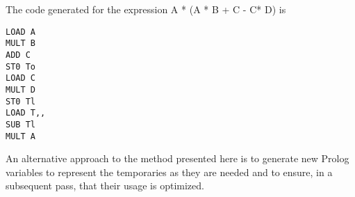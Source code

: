 The code generated for the expression A * (A * B + C - C* D) is
\begin{verbatim}
LOAD A
MULT B
ADD C
ST0 To
LOAD C
MULT D
ST0 Tl
LOAD T,,
SUB Tl
MULT A 
\end{verbatim}

An alternative approach to the method presented here is to generate new
Prolog variables to represent the temporaries as they are needed and to ensure,
in a subsequent pass, that their usage is optimized. 
 
\secup